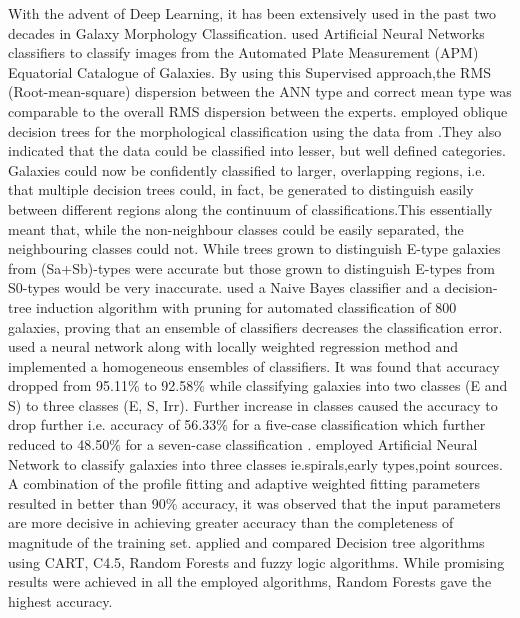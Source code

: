 \documentclass[fleqn,usenatbib]{mnras}
\begin{document}
With the advent of Deep Learning, it has been extensively used in the past two decades in Galaxy Morphology Classification. \citet{Naim/mnras/275.3.567} used Artificial Neural Networks classifiers to classify images from the Automated Plate Measurement (APM) Equatorial Catalogue of Galaxies. By using this Supervised approach,the RMS (Root-mean-square) dispersion between the ANN type and correct mean type was comparable to the overall RMS dispersion between the experts.  \citet{Owens/mnras/281.1.153} employed oblique decision trees for the morphological classification using the data from \citet{Storrie1992}.They also indicated that the data could be classified into lesser, but well defined categories. Galaxies could now be confidently classified to larger, overlapping regions, i.e. that multiple decision trees could, in fact, be generated to distinguish easily between different regions along the continuum of classifications.This essentially meant that, while the non-neighbour classes could be easily separated, the neighbouring classes could not. While trees grown to distinguish E-type galaxies from (Sa+Sb)-types were accurate but those grown to distinguish E-types from S0-types would be very inaccurate. \citet{Bazell_2001} used a Naive Bayes classifier and a decision-tree induction algorithm with pruning for automated classification of 800 galaxies, proving that an ensemble of classifiers decreases the classification error. \citet{De_La_Calleja2004} used a neural network along with locally weighted regression method and implemented a homogeneous ensembles of classifiers. It was found that accuracy dropped from 95.11\% to 92.58\% while classifying galaxies into two classes (E and S) to three classes (E, S, Irr). Further increase in classes caused the accuracy to drop further i.e. accuracy of 56.33\% for a five-case classification which further reduced to 48.50\% for a seven-case classification \citep{De_La_Calleja2004}. \citet{Banerji_2010} employed Artificial Neural Network to classify  galaxies into three classes ie.spirals,early types,point sources. A combination of the profile fitting and adaptive weighted fitting parameters resulted in better than 90\% accuracy, it was observed that the input parameters are more decisive in achieving greater accuracy than the completeness of magnitude of the training set. \citet{Gauci2010} applied and compared Decision tree algorithms using CART, C4.5, Random Forests and fuzzy logic algorithms. While promising results were achieved in all the employed algorithms, Random Forests gave the highest accuracy.\\
\end{document}
